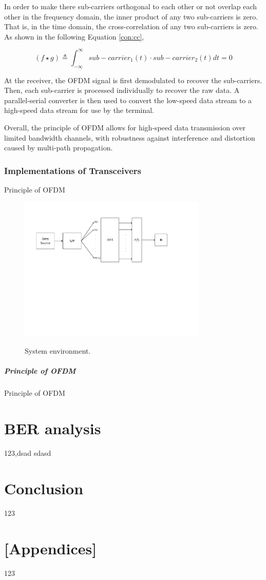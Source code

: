 \documentclass{article}
\begin{document}
In order to make there sub-carriers orthogonal to each other or not overlap each other in the frequency domain, the inner product of any two sub-carriers is zero. That is, in the time domain, the cross-correlation of any two sub-carriers is zero. As shown in the following Equation \ref{con:cc},

\begin{equation}
(f \star g) \triangleq \int_{-\infty}^{\infty} sub-carrier_1(t) \cdot sub-carrier_2(t)dt=0 \label{con:cc}
\end{equation}

At the receiver, the OFDM signal is first demodulated to recover the sub-carriers. Then, each sub-carrier is processed individually to recover the raw data. A parallel-serial converter is then used to convert the low-speed data stream to a high-speed data stream for use by the terminal.

Overall, the principle of OFDM allows for high-speed data transmission over limited bandwidth channels, with robustness against interference and distortion caused by multi-path propagation.

\subsubsection{Implementations of Transceivers}
Principle of OFDM

\begin{figure}
  \centering
  \includegraphics[width=0.8\textwidth]{images/OFDM_transceiver.pdf}\\
  \caption{System environment.}
  \label{fig:env}
\end{figure}

\subparagraph{Principle of OFDM}
Principle of OFDM


\section{BER analysis}
123\cite{RN79},dsad
sdasd

\section{Conclusion}
123





\section{[Appendices]}
123


	
\end{document}
